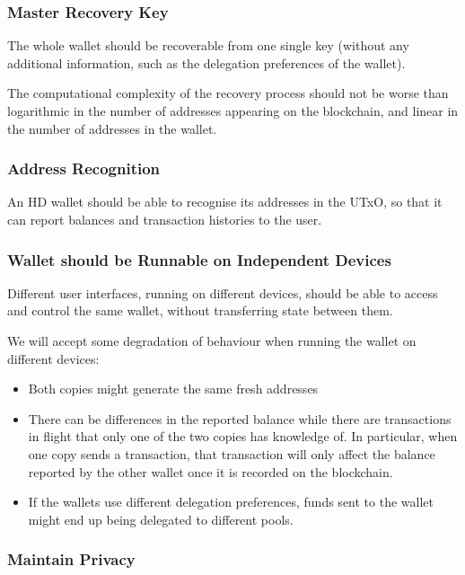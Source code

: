 \documentclass[11pt,a4paper]{article}
\begin{document}
\subsubsection{Master Recovery Key}
\label{master-recovery-key}

The whole wallet should be recoverable from one single key (without any
additional information, such as the delegation preferences of the
wallet).

The computational complexity of the recovery process should not be worse
than logarithmic in the number of addresses appearing on the blockchain,
and linear in the number of addresses in the wallet.

\subsubsection{Address Recognition}
\label{address-recognition}

An HD wallet should be able to recognise its addresses in the UTxO, so
that it can report balances and transaction histories to the user.

\subsubsection{Wallet should be Runnable on Independent Devices}
\label{wallet-should-be-runnable-on-independent-devices}

Different user interfaces, running on different devices, should be able
to access and control the same wallet, without transferring state
between them.

We will accept some degradation of behaviour when running the wallet on
different devices:

\begin{itemize}
\item
  Both copies might generate the same fresh addresses
\item
  There can be differences in the reported balance while there are
  transactions in flight that only one of the two copies has knowledge
  of. In particular, when one copy sends a transaction, that transaction
  will only affect the balance reported by the other wallet once it is
  recorded on the blockchain.
\item
  If the wallets use different delegation preferences, funds sent to the
  wallet might end up being delegated to different pools.
\end{itemize}

\subsubsection{Maintain Privacy}
\label{maintain-privacy}
\end{document}
